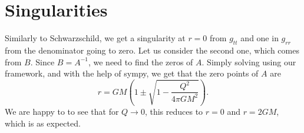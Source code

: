 \documentclass{article}
\begin{document}
\section{Singularities}
Similarly to Schwarzschild, we get a singularity at $r=0$ from $g_{tt}$ and one in $g_{rr}$ from the denominator going to zero.
Let us consider the second one, which comes from $B$.
Since $B = A^{-1}$, we need to find the zeros of $A$.
Simply solving using our framework, and with the help of sympy, we get that the zero points of $A$ are
$$
r = G M \left(1 \pm \sqrt{1 - \frac{Q^{2}}{4 \pi G M^{2}}}\right).
$$
We are happy to to see that for $Q\rightarrow 0$, this reduces to $r=0$ and $r=2GM$, which is as expected.
\end{document}

